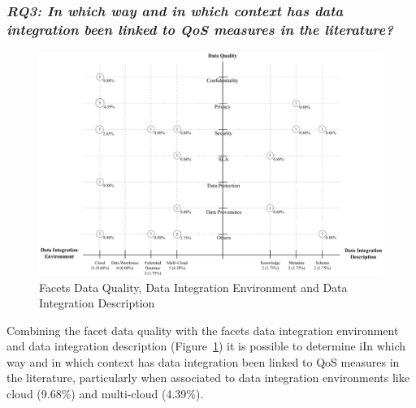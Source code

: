 \subsubsection{\textit{RQ3:  In which way and in which context has data integration been linked to QoS measures in the literature?}}
\begin{figure}[!h]
\centering
\includegraphics[scale=0.44]{figs/bubble-charts/Data-Quality-DI.pdf}
\caption{Facets Data Quality, Data Integration Environment and Data Integration Description}\label{fig:facet4}
\end{figure}

Combining the facet data quality with the facets data integration environment and data integration description
(Figure~\ref{fig:facet4}) it is possible to determine iIn which way and in which context has data integration been linked to QoS measures in the literature, particularly when associated to data integration environments like cloud  (9.68\%) and multi-cloud (4.39\%).


% 
